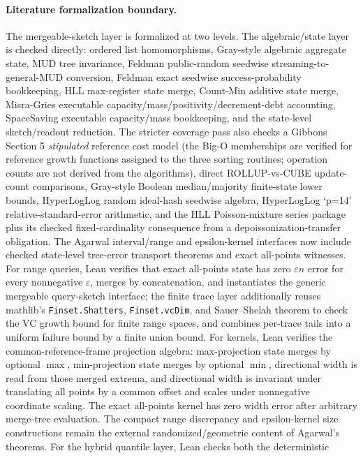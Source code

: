 \paragraph{Literature formalization boundary.} The mergeable-sketch layer is
formalized at two levels. The algebraic/state layer is checked directly:
ordered list homomorphisms, Gray-style algebraic aggregate state, MUD tree
invariance, Feldman public-random seedwise streaming-to-general-MUD conversion,
Feldman exact seedwise success-probability bookkeeping, HLL max-register state
merge, Count-Min additive state merge, Misra-Gries executable
capacity/mass/positivity/decrement-debt accounting, SpaceSaving executable
capacity/mass bookkeeping, and the state-level sketch/readout reduction. The stricter coverage
pass also checks a Gibbons Section 5 \emph{stipulated} reference cost model
(the Big-O memberships are verified for reference growth functions assigned to
the three sorting routines; operation counts are not derived from the
algorithms), direct
ROLLUP-vs-CUBE update-count comparisons, Gray-style Boolean median/majority
finite-state lower bounds, HyperLogLog random ideal-hash seedwise algebra,
HyperLogLog `p=14' relative-standard-error arithmetic, and the HLL
Poisson-mixture series package plus its checked fixed-cardinality consequence
from a depoissonization-transfer obligation.
The Agarwal interval/range and epsilon-kernel interfaces now include checked
state-level tree-error transport theorems and exact all-points witnesses.  For
range queries, Lean verifies that exact all-points state has zero
\(\varepsilon n\) error for every nonnegative \(\varepsilon\), merges by
concatenation, and instantiates the generic mergeable query-sketch interface;
the finite trace layer additionally reuses mathlib's \texttt{Finset.Shatters},
\texttt{Finset.vcDim}, and Sauer--Shelah theorem to check the VC growth
bound for finite range spaces, and combines per-trace tails into a uniform
failure bound by a finite union bound.
For kernels, Lean verifies the common-reference-frame projection algebra:
max-projection state merges by optional \(\max\), min-projection state merges
by optional \(\min\), directional width is read from those merged extrema, and
directional width is invariant under translating all points by a common offset
and scales under nonnegative coordinate scaling.
The exact all-points
kernel has zero width error after arbitrary merge-tree evaluation.  The compact
range discrepancy and epsilon-kernel size constructions remain the external
randomized/geometric content of Agarwal's theorems.
For the hybrid quantile layer, Lean checks both the deterministic
